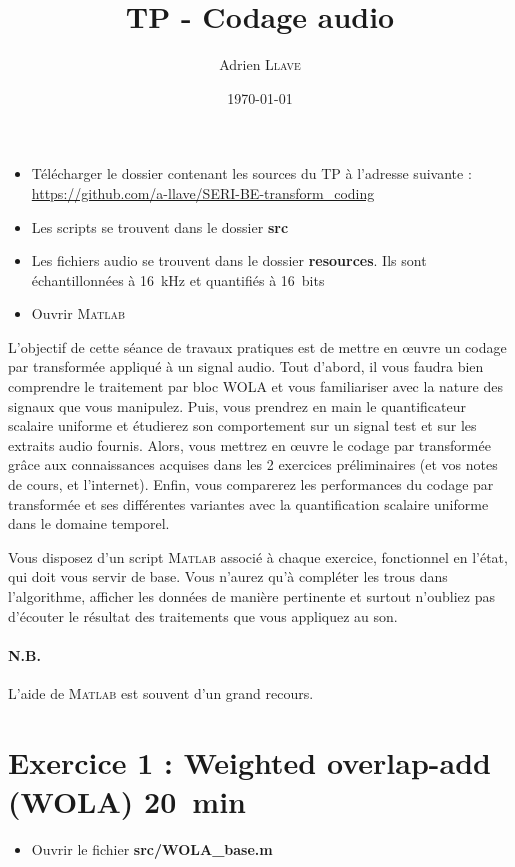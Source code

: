 \documentclass{article}
\title{\textbf{TP - Codage audio}}
\author{Adrien \textsc{Llave}}
\date{\today}
\begin{document}
\maketitle

\begin{itemize}
	\item Télécharger le dossier contenant les sources du TP à l'adresse suivante : \url{https://github.com/a-llave/SERI-BE-transform_coding}
	\item Les scripts se trouvent dans le dossier \textbf{src}
	\item Les fichiers audio se trouvent dans le dossier \textbf{resources}. Ils sont échantillonnées à 16~kHz et quantifiés à 16~bits
	\item Ouvrir \textsc{Matlab}
\end{itemize}


L'objectif de cette séance de travaux pratiques est de mettre en \oe uvre un codage par transformée appliqué à un signal audio. Tout d'abord, il vous faudra bien comprendre le traitement par bloc WOLA et vous familiariser avec la nature des signaux que vous manipulez. Puis, vous prendrez en main le quantificateur scalaire uniforme et étudierez son comportement sur un signal test et sur les extraits audio fournis.
Alors, vous mettrez en \oe uvre le codage par transformée grâce aux connaissances acquises dans les 2 exercices préliminaires (et vos notes de cours, et l'internet). Enfin, vous comparerez les performances du codage par transformée et ses différentes variantes avec la quantification scalaire uniforme dans le domaine temporel.

Vous disposez d'un script \textsc{Matlab} associé à chaque exercice, fonctionnel en l'état, qui doit vous servir de base. Vous n'aurez qu'à compléter les trous dans l'algorithme, afficher les données de manière pertinente et surtout n'oubliez pas d'écouter le résultat des traitements que vous appliquez au son.

\paragraph{N.B.} L'aide de \textsc{Matlab} est souvent d'un grand recours.

\section{Exercice 1 : Weighted overlap-add (WOLA) \small{20~min}}
\begin{itemize}
	\item Ouvrir le fichier \textbf{src/WOLA\_base.m}
\end{itemize}
\end{document}

